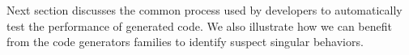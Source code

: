 Next section discusses the common process used by developers to automatically test the performance of generated code. We also illustrate how we can benefit from the code generators families to identify suspect singular behaviors.





 



